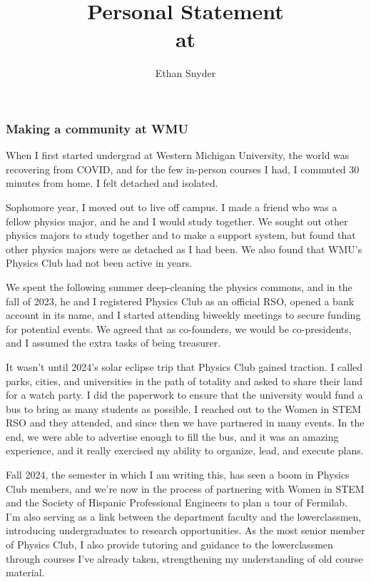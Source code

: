 \documentclass[11pt]{article}
\title{Personal Statement\\
	\large \dept{} at \school{}}
\author{Ethan Snyder}
\date{}
\begin{document}
\maketitle
\subsubsection*{Making a community at WMU}
When I first started undergrad at Western Michigan University, the world was recovering from COVID, and for the few in-person courses I had, I commuted 30 minutes from home. I felt detached and isolated.

Sophomore year, I moved out to live off campus. I made a friend who was a fellow physics major, and he and I would study together. We sought out other physics majors to study together and to make a support system, but found that other physics majors were as detached as I had been. We also found that WMU's Physics Club had not been active in years.

We spent the following summer deep-cleaning the physics commons, and in the fall of 2023, he and I registered Physics Club as an official RSO, opened a bank account in its name, and I started attending biweekly meetings to secure funding for potential events. We agreed that as co-founders, we would be co-presidents, and I assumed the extra tasks of being treasurer.

It wasn't until 2024's solar eclipse trip that Physics Club gained traction. I called parks, cities, and universities in the path of totality and asked to share their land for a watch party. I did the paperwork to ensure that the university would fund a bus to bring as many students as possible. I reached out to the Women in STEM RSO and they attended, and since then we have partnered in many events. In the end, we were able to advertise enough to fill the bus, and it was an amazing experience, and it really exercised my ability to organize, lead, and execute plans.

Fall 2024, the semester in which I am writing this, has seen a boom in Physics Club members, and we're now in the process of partnering with Women in STEM and the Society of Hispanic Professional Engineers to plan a tour of Fermilab. I'm also serving as a link between the department faculty and the lowerclassmen, introducing undergraduates to research opportunities. As the most senior member of Physics Club, I also provide tutoring and guidance to the lowerclassmen through courses I've already taken, strengthening my understanding of old course material.
\end{document}
